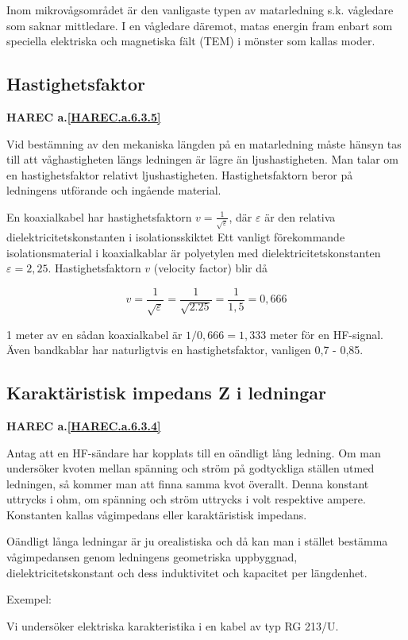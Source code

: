 Inom mikrovågsområdet är den vanligaste typen av matarledning
s.k. vågledare som saknar mittledare. I en vågledare däremot, matas
energin fram enbart som speciella elektriska och magnetiska fält (TEM)
i mönster som kallas moder.

\subsection{Hastighetsfaktor}
\textbf{
HAREC a.\ref{HAREC.a.6.3.5}\label{myHAREC.a.6.3.5}
}

Vid bestämning av den mekaniska längden på en matarledning måste
hänsyn tas till att våghastigheten längs ledningen är lägre än
ljushastigheten. Man talar om en hastighetsfaktor relativt
ljushastigheten. Hastighetsfaktorn beror på ledningens utförande och
ingående material.

En koaxialkabel har hastighetsfaktorn \(v =
\frac{1}{\sqrt{\varepsilon}}\), där \(\varepsilon\) är den relativa
dielektricitetskonstanten i isolationsskiktet Ett vanligt förekommande
isolationsmaterial i koaxialkablar är polyetylen med
dielektricitetskonstanten \(\varepsilon = 2,25\).  Hastighetsfaktorn
\(v\) (velocity factor) blir då

\[
v = \frac{1}{\sqrt{\varepsilon}} = \frac{1}{\sqrt{2.25}} = \frac{1}{1,5} = 0,666
\]

1 meter av en sådan koaxialkabel är \(1/0,666 = 1,333\) meter för en
HF-signal.  Även bandkablar har naturligtvis en hastighetsfaktor,
vanligen 0,7 - 0,85.

\subsection{Karaktäristisk impedans Z i ledningar}
\textbf{
HAREC a.\ref{HAREC.a.6.3.4}\label{myHAREC.a.6.3.4}
}

Antag att en HF-sändare har kopplats till en oändligt lång ledning. Om
man undersöker kvoten mellan spänning och ström på godtyckliga ställen
utmed ledningen, så kommer man att finna samma kvot överallt.  Denna
konstant uttrycks i ohm, om spänning och ström uttrycks i volt
respektive ampere. Konstanten kallas vågimpedans eller karaktäristisk
impedans.

Oändligt långa ledningar är ju orealistiska och då kan man i stället
bestämma vågimpedansen genom ledningens geometriska uppbyggnad,
dielektricitetskonstant och dess induktivitet och kapacitet per
längdenhet.

Exempel:

Vi undersöker elektriska karakteristika i en kabel av typ RG 213/U.

